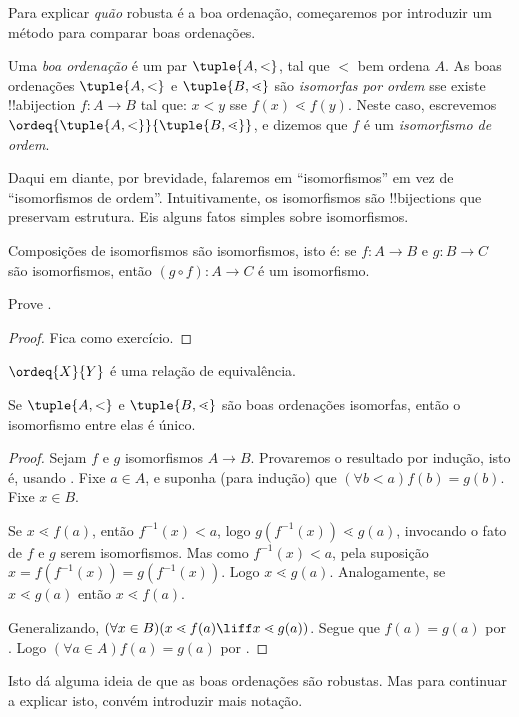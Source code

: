 \documentclass[../../../include/open-logic-section]{subfiles}
\begin{document}

Para explicar \emph{quão} robusta é a boa ordenação, começaremos por
introduzir um método para comparar boas ordenações.

\begin{defn}
Uma \emph{boa ordenação} é um par $\tuple{A, <}$, tal que $<$
bem ordena $A$. As boas ordenações $\tuple{A, <}$ e $\tuple{B,
\lessdot}$ são \emph{isomorfas por ordem} {sse} existe !!a{bijection}
$f \colon A \to B$ tal que: $x < y$ sse $f(x) \lessdot  f(y)$. Neste
caso, escrevemos $\ordeq{\tuple{A, <}}{\tuple{B, \lessdot}}$, e
dizemos que $f$ é um \emph{isomorfismo de ordem}.
\end{defn}
\noindent
Daqui em diante, por brevidade, falaremos em ``isomorfismos'' em vez de
``isomorfismos de ordem''. Intuitivamente, os isomorfismos são
!!{bijection}s que preservam estrutura. Eis alguns fatos simples sobre
isomorfismos.

\begin{lem}
Composições de isomorfismos são isomorfismos, isto é: se $f \colon A
\to B$ e $g \colon B \to C$ são isomorfismos, então $(g \circ f)
\colon A \to C$ é um isomorfismo.
\end{lem}
\begin{prob}
	Prove .
\end{prob}
\begin{proof}
Fica como exercício.
\end{proof}
\begin{cor}
	$\ordeq{X}{Y}$ é uma relação de equivalência.
\end{cor}
\begin{prop}
Se $\tuple{A, <}$ e $\tuple{B, \lessdot}$ são boas ordenações isomorfas,
então o isomorfismo entre elas é único.
\end{prop}

\begin{proof}
Sejam $f$ e $g$ isomorfismos $A \to B$. Provaremos o resultado por indução, isto é, usando . 
Fixe $a\in A$, e suponha (para indução) que $(\forall b < a)f(b) = g(b)$. Fixe $x \in B$. 

Se $x \lessdot f(a)$, então $f^{-1}(x) < a$, logo $g(f^{-1}(x)) \lessdot
g(a)$, invocando o fato de $f$ e $g$ serem isomorfismos. Mas como
$f^{-1}(x) < a$, pela suposição $x =f(f^{-1}(x)) = g(f^{-1}(x))$.
Logo $x \lessdot g(a)$. Analogamente, se $x \lessdot g(a)$ então $x \lessdot
f(a)$. 

Generalizando, $(\forall x \in B)(x \lessdot f(a) \liff x \lessdot
g(a))$. Segue que $f(a) = g(a)$ por
. Logo $(\forall
a \in A)f(a) = g(a)$ por .
\end{proof}\noindent 
Isto dá alguma ideia de que as boas ordenações são robustas. Mas para
continuar a explicar isto, convém introduzir mais notação.
\end{document}
